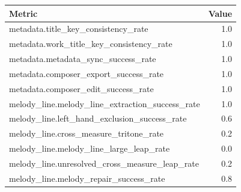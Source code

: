 \begin{tabular}{lr}
Metric & Value \\
\hline
metadata.title_key_consistency_rate & 1.0 \\
metadata.work_title_key_consistency_rate & 1.0 \\
metadata.metadata_sync_success_rate & 1.0 \\
metadata.composer_export_success_rate & 1.0 \\
metadata.composer_edit_success_rate & 1.0 \\
melody_line.melody_line_extraction_success_rate & 1.0 \\
melody_line.left_hand_exclusion_success_rate & 0.6 \\
melody_line.cross_measure_tritone_rate & 0.2 \\
melody_line.melody_line_large_leap_rate & 0.0 \\
melody_line.unresolved_cross_measure_leap_rate & 0.2 \\
melody_line.melody_repair_success_rate & 0.8 \\
\end{tabular}
